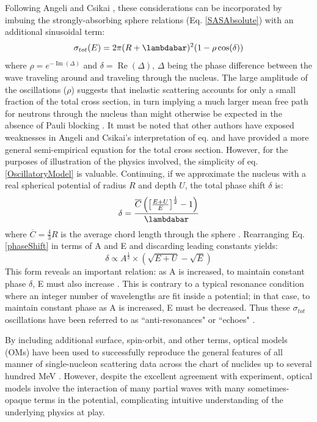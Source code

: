 \documentclass[twocolumn,secnumarabic,amssymb, nobibnotes, aps, prl,
superscriptaddress, nobalancelastpage]{revtex4}
\newcommand{\tots}{\ensuremath{\sigma_{tot}}\,\,}
\newcommand{\totE}{\ensuremath{\sigma_{tot}}(E)}
\begin{document}
Following Angeli and Csikai \cite{Angeli1970}, these considerations can be incorporated by
imbuing the strongly-absorbing sphere relations (Eq. \ref{SASAbsolute}) with an additional sinusoidal term:
\begin{equation} \label{OscillatoryModel}
    \totE = 2\pi (R+\lambdabar)^{2}(1 - \rho \cos(\delta))
\end{equation}
where $\rho = e^{-\operatorname{Im}(\Delta)}$ and $\delta =
\operatorname{Re}(\Delta)$, $\Delta$ being the phase difference between the wave traveling
around and traveling through the nucleus. The large amplitude of the
oscillations ($\rho$) suggests that inelastic scattering accounts for only a small fraction of the total cross section, in turn implying a 
much larger mean free path for neutrons through the nucleus 
than might otherwise be expected in the absence of Pauli blocking
\cite{Mohr1955}. It must be noted that other authors \cite{Ahmad1973} have
exposed weaknesses in Angeli and Csikai's interpretation of
eq. \label{OscillatoryModel} and have provided a more general semi-empirical
equation for the total cross section. However, for the purposes of illustration
of the physics involved, the simplicity of eq. \ref{OscillatoryModel} is valuable.
Continuing, if we approximate the nucleus with a
real spherical potential of radius $R$ and depth $U$, the total phase shift $\delta$ is:
\begin{equation} \label{phaseShift}
    \delta =
    \frac{\overline{C}\left(\left[{\frac{E+U}{E}}\right]^{\frac{1}{2}}-1\right)}{\lambdabar}
\end{equation}
where $\overline{C} = \frac{4}{3}R$ is the average chord length through the
sphere \cite{Angeli1970}. Rearranging Eq. \ref{phaseShift} in terms of A and E and
discarding leading constants yields:
\begin{equation}
    \delta \propto A^{\frac{1}{3}}\times\left(\sqrt{E+U}-\sqrt{E}\right)
\end{equation}
This form reveals an important relation: as A is increased, to maintain constant 
phase $\delta$, E must also increase \cite{Satchler1980, Peterson1962}. 
This is contrary to a typical resonance condition where an integer number of wavelengths
are fit inside a potential; in that case, to maintain constant phase as A is increased,
E must be decreased. Thus these \tots oscillations have been referred to as
``anti-resonances" or ``echoes" \cite{Satchler1980, McVoy1967}.

By including additional surface, spin-orbit, and other terms, optical models (OMs) have been 
used to successfully reproduce the general features of all manner of single-nucleon scattering 
data across the chart of nuclides up to several hundred MeV \cite{Perey76, CH89}. 
However, despite the excellent agreement with experiment, optical models
involve the interaction of many partial waves with many sometimes-opaque terms
in the potential, complicating intuitive understanding of the underlying
physics at play.
\end{document}
